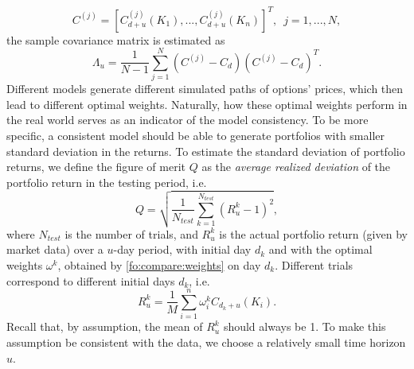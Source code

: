 \documentclass{article}
\numberwithin{equation}{section}
\begin{document}
$$
C^{(j)} = \left[C^{(j)}_{d+u}(K_1),...,C^{(j)}_{d+u}(K_n)\right]^T,\,\,\, j = 1,...,N,
$$ 
the sample covariance matrix is estimated as 
\begin{equation}\label{fo:compare:cov}
\Lambda_u = \frac{1}{N-1} \sum_{j=1}^{N} (C^{(j)}-C_d) (C^{(j)}-C_d)^T.
\end{equation} 
Different models generate different simulated paths of options' prices, which then lead to different optimal weights. Naturally, how these optimal weights perform in the real world serves as an indicator of the model consistency. To be more specific, a consistent model should be able to generate portfolios with smaller standard deviation in the returns. 
To estimate the standard deviation of portfolio returns, we define the figure of merit $Q$ as the \textit{average realized deviation} of the portfolio return in the testing period, i.e. 
\begin{equation}\label{fo:compare:Q}
Q = \sqrt{\frac{1}{N_{test}} \sum_{k=1}^{N_{test}} (R^k_u - 1)^2},
\end{equation}
where $N_{test}$ is the number of trials, and $R^k_u$ is the actual portfolio return (given by market data) over a $u$-day period, with initial day $d_k$ and with the optimal weights $\omega^k$, obtained by \eqref{fo:compare:weights} on day $d_k$. Different trials correspond to different initial days $d_k$, i.e. 
\begin{equation}
R^k_u 
= \frac{1}{M}\sum_{i=1}^n \omega^k_i C_{d_k+u}(K_i).  
\end{equation}
Recall that, by assumption, the mean of $R^k_u$ should always be 1. To make this assumption be consistent with the data, we choose a relatively small time horizon $u$.
\end{document}
